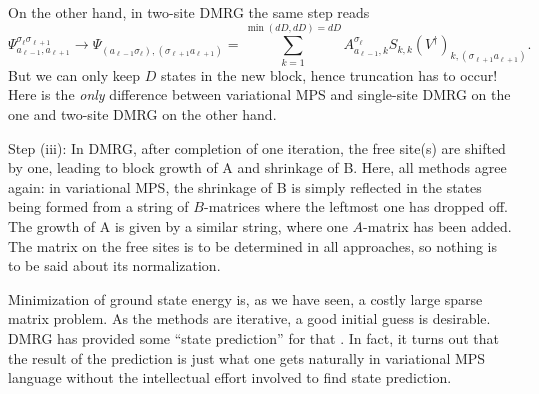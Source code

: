 On the other hand, in two-site DMRG the same step reads
\begin{equation}
\Psi^{\sigma_ \ell\sigma_{\ell +1}}_{a_{\ell-1},a_{\ell +1}} \rightarrow \Psi_{(a_{\ell-1} \sigma_ \ell), (\sigma_{\ell +1} a_{\ell +1})} = \sum_{k=1}^{\min(dD,dD)=dD} A^{\sigma_ \ell}_{a_{\ell-1},k} S_{k,k} (V^\dagger)_{k,(\sigma_{\ell +1} a_{\ell +1})} .
\end{equation}
But we can only keep $D$ states in the new block, hence truncation has to occur! Here is the {\em only} difference between variational MPS and single-site DMRG on the one and two-site DMRG on the other hand.

Step (iii): In DMRG, after completion of one iteration, the free site(s) are shifted by one, leading to block growth of A and shrinkage of B. Here, all methods agree again: in variational MPS, the shrinkage of B is simply reflected in the states being formed from a string of $B$-matrices where the leftmost one has dropped off. The growth of A is given by a similar string, where one $A$-matrix has been added. The matrix on the free sites is to be determined in all approaches, so nothing is to be said about its normalization.

Minimization of ground state energy is, as we have seen, a costly large sparse matrix problem. As the methods are iterative, a good initial guess is desirable. DMRG has provided some ``state prediction'' for that \cite{White96}. In fact, it turns out that the result of the prediction is just what one gets naturally in variational MPS language without the intellectual effort involved to find state prediction. 

